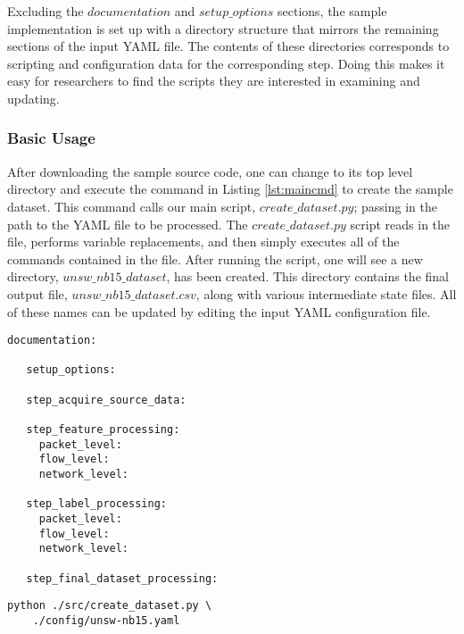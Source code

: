 \documentclass[sigconf]{acmart}
\begin{document}
Excluding the $documentation$ and $setup\_options$ sections, the sample implementation is set up with a directory structure that mirrors the remaining sections of the input YAML file.
The contents of these directories corresponds to scripting and configuration data for the corresponding step.
Doing this makes it easy for researchers to find the scripts they are interested in examining and updating.

\subsubsection{Basic Usage}\label{subsubsec:basic_usage}
After downloading the sample source code, one can change to its top level directory and execute the command in Listing \ref{lst:maincmd} to create the sample dataset.
This command calls our main script, $create\_dataset.py$; passing in the path to the YAML file to be processed.
The $create\_dataset.py$ script reads in the file, performs variable replacements, and then simply executes all of the commands contained  in the file.
After running the script, one will see a new directory, $unsw\_nb15\_dataset$, has been created.
This directory contains the final output file, $unsw\_nb15\_dataset.csv$, along with various intermediate state files.
All of these names can be updated by editing the input YAML configuration file.

\noindent\begin{minipage}{\linewidth}
\begin{lstlisting}[aboveskip=10pt, label=lst:yamltemplate, caption={A template input file for our sample guidelines implementation.  Each section would be filled in with either information or explicit commands that get run.}, captionpos=b, basicstyle=\footnotesize, backgroundcolor=\color{gray!10!white}, frame=stb]
   documentation:
   
   setup_options:
   
   step_acquire_source_data:
   
   step_feature_processing:
     packet_level:
     flow_level:
     network_level:
   
   step_label_processing:
     packet_level:
     flow_level:
     network_level:
   
   step_final_dataset_processing:
\end{lstlisting}
\end{minipage}


\begin{lstlisting}[label=lst:maincmd, caption={The command to run to execute the sample implementation of the guidelines.}, captionpos=b, basicstyle=\footnotesize, backgroundcolor=\color{gray!10!white}, frame=stb, breaklines=True]
python ./src/create_dataset.py \
    ./config/unsw-nb15.yaml
\end{lstlisting}
\end{document}
